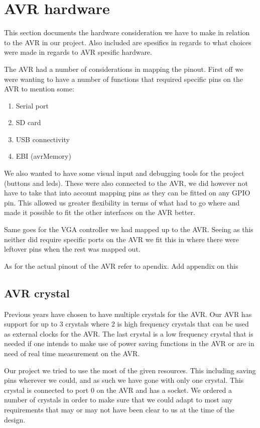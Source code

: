 \section{AVR hardware}

This section documents the hardware consideration we have to make in relation to the AVR in our project. Also included are spesifics in regards to what choices were made in regards to AVR spesific hardware.

The AVR had a number of considerations in mapping the pinout. First off we were wanting to have a number of functions that required specific pins on the AVR to mention some:

\begin{enumerate}
\item Serial port
\item SD card 
\item USB connectivity
\item EBI (avrMemory)
\end{enumerate}

We also wanted to have some visual input and debugging tools for the project (buttons and leds). These were also connected to the AVR, we did however not have to take that into account mapping pins as they can be fitted on any GPIO pin. This allowed us greater flexibility in terms of what had to go where and made it possible to fit the other interfaces on the AVR better.

Same goes for the VGA controller we had mapped up to the AVR. Seeing as this neither did require specific ports on the AVR we fit this in where there were leftover pins when the rest was mapped out.

As for the actual pinout of the AVR refer to apendix.
\TODO Add appendix on this

\subsection{AVR crystal}

Previous years have chosen to have multiple crystals for the AVR. Our AVR has support for up to 3 crystals where 2 is high frequency crystals that can be used as external clocks for the AVR. The last crystal is a low frequency crystal that is needed if one intends to make use of power saving functions in the AVR or are in need of real time measurement on the AVR.

Our project we tried to use the most of the given resources. This including saving pins wherever we could, and as such we have gone with only one crystal. This crystal is connected to port 0 on the AVR and has a socket. We ordered a number of crystals in order to make sure that we could adapt to most any requirements that may or may not have been clear to us at the time of the design.

